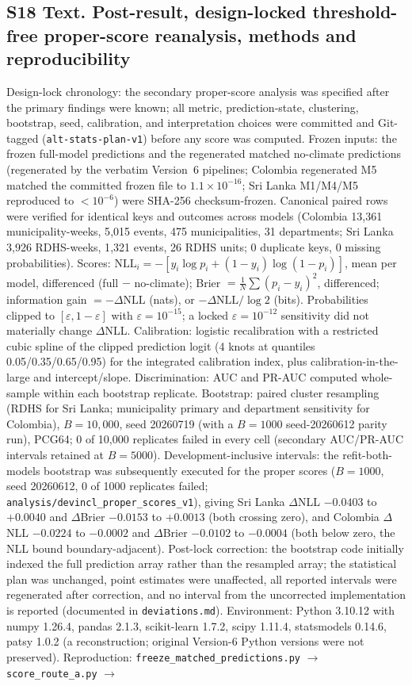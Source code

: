 \documentclass[11pt,a4paper]{article}
\begin{document}
\subsection*{S18 Text. Post-result, design-locked threshold-free proper-score reanalysis, methods and reproducibility}
Design-lock chronology: the secondary proper-score analysis was specified after the primary findings were known; all metric, prediction-state, clustering, bootstrap, seed, calibration, and interpretation choices were committed and Git-tagged (\texttt{alt-stats-plan-v1}) before any score was computed. Frozen inputs: the frozen full-model predictions and the regenerated matched no-climate predictions (regenerated by the verbatim Version~6 pipelines; Colombia regenerated M5 matched the committed frozen file to $1.1\times10^{-16}$; Sri Lanka M1/M4/M5 reproduced to $<10^{-6}$) were SHA-256 checksum-frozen. Canonical paired rows were verified for identical keys and outcomes across models (Colombia 13{,}361 municipality-weeks, 5{,}015 events, 475 municipalities, 31 departments; Sri Lanka 3{,}926 RDHS-weeks, 1{,}321 events, 26 RDHS units; 0 duplicate keys, 0 missing probabilities). Scores: $\mathrm{NLL}_i=-[y_i\log p_i+(1-y_i)\log(1-p_i)]$, mean per model, differenced (full $-$ no-climate); Brier $=\frac1N\sum(p_i-y_i)^2$, differenced; information gain $=-\Delta\mathrm{NLL}$ (nats), or $-\Delta\mathrm{NLL}/\log 2$ (bits). Probabilities clipped to $[\varepsilon,1-\varepsilon]$ with $\varepsilon=10^{-15}$; a locked $\varepsilon=10^{-12}$ sensitivity did not materially change $\Delta$NLL. Calibration: logistic recalibration with a restricted cubic spline of the clipped prediction logit (4 knots at quantiles 0.05/0.35/0.65/0.95) for the integrated calibration index, plus calibration-in-the-large and intercept/slope. Discrimination: AUC and PR-AUC computed whole-sample within each bootstrap replicate. Bootstrap: paired cluster resampling (RDHS for Sri Lanka; municipality primary and department sensitivity for Colombia), $B=10{,}000$, seed 20260719 (with a $B=1000$ seed-20260612 parity run), PCG64; 0 of 10{,}000 replicates failed in every cell (secondary AUC/PR-AUC intervals retained at $B=5000$). Development-inclusive intervals: the refit-both-models bootstrap was subsequently executed for the proper scores ($B=1000$, seed 20260612, 0 of 1000 replicates failed; \texttt{analysis/devincl\_proper\_scores\_v1}), giving Sri Lanka $\Delta$NLL $-0.0403$ to $+0.0040$ and $\Delta$Brier $-0.0153$ to $+0.0013$ (both crossing zero), and Colombia $\Delta$NLL $-0.0224$ to $-0.0002$ and $\Delta$Brier $-0.0102$ to $-0.0004$ (both below zero, the NLL bound boundary-adjacent). Post-lock correction: the bootstrap code initially indexed the full prediction array rather than the resampled array; the statistical plan was unchanged, point estimates were unaffected, all reported intervals were regenerated after correction, and no interval from the uncorrected implementation is reported (documented in \texttt{deviations.md}). Environment: Python 3.10.12 with numpy 1.26.4, pandas 2.1.3, scikit-learn 1.7.2, scipy 1.11.4, statsmodels 0.14.6, patsy 1.0.2 (a reconstruction; original Version-6 Python versions were not preserved). Reproduction: \texttt{freeze\_matched\_predictions.py} $\to$ \texttt{score\_route\_a.py} $\to$ 
\end{document}
